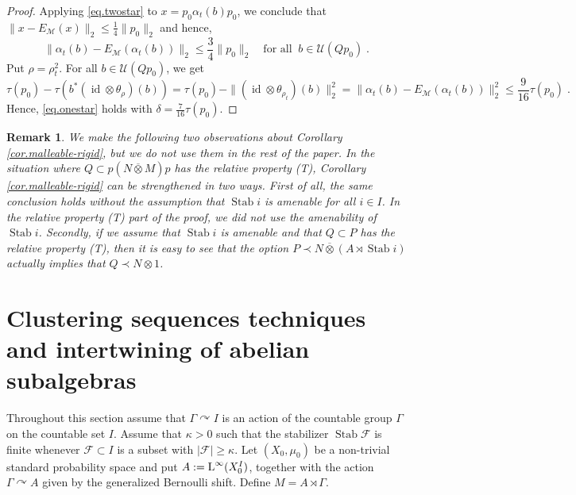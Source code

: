 \documentclass[a4paper,11pt]{amsart}
\numberwithin{equation}{section}
\newtheorem{remark}[definition]{Remark}
\begin{document}
\begin{proof}
Applying \eqref{eq.twostar} to $x = p_0 {\alpha}_t(b) p_0$, we conclude that $\|x-E_{\mathcal{M}}(x)\|_2 {\leqslant} \frac{1}{4} \|p_0\|_2$ and hence,
$$\|{\alpha}_t(b) - E_{\mathcal{M}}({\alpha}_t(b)) \|_2 {\leqslant} \frac{3}{4}\|p_0\|_2 \quad\text{for all}\;\; b \in {\mathcal{U}}(Qp_0) \; .$$
Put $\rho = \rho_t^2$. For all $b \in {\mathcal{U}}(Qp_0)$, we get
$$\tau(p_0) - \tau(b^* ({\mathord{\operatorname{id}}} {\otimes} \theta_\rho)(b)) = \tau(p_0) - \|({\mathord{\operatorname{id}}} {\otimes} \theta_{\rho_t})(b)\|_2^2 = \|{\alpha}_t(b) - E_{\mathcal{M}}({\alpha}_t(b))\|_2^2 {\leqslant} \frac{9}{16} \tau(p_0) \; .$$
Hence, \eqref{eq.onestar} holds with $\delta = \frac{7}{16}\tau(p_0)$.
\end{proof}

\begin{remark}
We make the following two observations about Corollary \ref{cor.malleable-rigid}, but we do not use them in the rest of the paper.
In the situation where $Q \subset p (N {\mathbin{\overline{\otimes}}} M)p$ has the relative property (T), Corollary \ref{cor.malleable-rigid} can be strengthened in two ways. First of all, the same conclusion holds without the assumption that ${\operatorname{Stab}} i$ is amenable for all $i \in I$. In the relative property (T) part of the proof, we did not use the amenability of ${\operatorname{Stab}} i$.
Secondly, if we assume that ${\operatorname{Stab}} i$ is amenable and that $Q \subset P$ has the relative property (T), then it is easy to see that the option $P {\prec} N {\mathbin{\overline{\otimes}}} (A \rtimes {\operatorname{Stab}} i)$ actually implies that $Q {\prec} N {\otimes} 1$.
\end{remark}

\section{Clustering sequences techniques and intertwining of abelian subalgebras}\label{sec.intertwine-abelian}

Throughout this section assume that $\Gamma {\curvearrowright} I$ is an action of the countable group $\Gamma$ on the countable set $I$. Assume that $\kappa > 0$ such that the stabilizer ${\operatorname{Stab}} {\mathcal{F}}$ is finite whenever ${\mathcal{F}} \subset I$ is a subset with $|{\mathcal{F}}| {\geqslant} \kappa$. Let $(X_0,\mu_0)$ be a non-trivial standard probability space and put $A := {\mathord{\text{\rm L}}}^\infty(X_0^I)$, together with the action $\Gamma {\curvearrowright} A$ given by the generalized Bernoulli shift. Define $M = A \rtimes \Gamma$.
\end{document}
